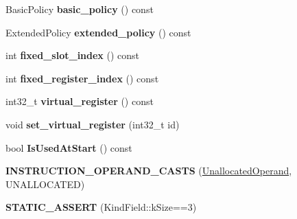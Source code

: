 \begin{DoxyCompactItemize}
\item 
Basic\+Policy {\bfseries basic\+\_\+policy} () const \hypertarget{classv8_1_1internal_1_1compiler_1_1_unallocated_operand_a96f3864297307c3fba4a3ae8106f9ed6}{}\label{classv8_1_1internal_1_1compiler_1_1_unallocated_operand_a96f3864297307c3fba4a3ae8106f9ed6}

\item 
Extended\+Policy {\bfseries extended\+\_\+policy} () const \hypertarget{classv8_1_1internal_1_1compiler_1_1_unallocated_operand_a1e8aad77edaf0aa00c8a65677c2af732}{}\label{classv8_1_1internal_1_1compiler_1_1_unallocated_operand_a1e8aad77edaf0aa00c8a65677c2af732}

\item 
int {\bfseries fixed\+\_\+slot\+\_\+index} () const \hypertarget{classv8_1_1internal_1_1compiler_1_1_unallocated_operand_a6af2c3c67decec9ea79d5a318f6a22d5}{}\label{classv8_1_1internal_1_1compiler_1_1_unallocated_operand_a6af2c3c67decec9ea79d5a318f6a22d5}

\item 
int {\bfseries fixed\+\_\+register\+\_\+index} () const \hypertarget{classv8_1_1internal_1_1compiler_1_1_unallocated_operand_afed704a1fe1e5b9241956d48691d1008}{}\label{classv8_1_1internal_1_1compiler_1_1_unallocated_operand_afed704a1fe1e5b9241956d48691d1008}

\item 
int32\+\_\+t {\bfseries virtual\+\_\+register} () const \hypertarget{classv8_1_1internal_1_1compiler_1_1_unallocated_operand_a9ff96924c7fd8e7640b352b73826c66c}{}\label{classv8_1_1internal_1_1compiler_1_1_unallocated_operand_a9ff96924c7fd8e7640b352b73826c66c}

\item 
void {\bfseries set\+\_\+virtual\+\_\+register} (int32\+\_\+t id)\hypertarget{classv8_1_1internal_1_1compiler_1_1_unallocated_operand_abee54b638709c6b74dea91dfd0f5fa4f}{}\label{classv8_1_1internal_1_1compiler_1_1_unallocated_operand_abee54b638709c6b74dea91dfd0f5fa4f}

\item 
bool {\bfseries Is\+Used\+At\+Start} () const \hypertarget{classv8_1_1internal_1_1compiler_1_1_unallocated_operand_a6f41463f77fb2ac91e8f0b1f238c149d}{}\label{classv8_1_1internal_1_1compiler_1_1_unallocated_operand_a6f41463f77fb2ac91e8f0b1f238c149d}

\item 
{\bfseries I\+N\+S\+T\+R\+U\+C\+T\+I\+O\+N\+\_\+\+O\+P\+E\+R\+A\+N\+D\+\_\+\+C\+A\+S\+TS} (\hyperlink{classv8_1_1internal_1_1compiler_1_1_unallocated_operand}{Unallocated\+Operand}, U\+N\+A\+L\+L\+O\+C\+A\+T\+ED)\hypertarget{classv8_1_1internal_1_1compiler_1_1_unallocated_operand_aa1f74bb77dcc743aa2d99418bfd5607e}{}\label{classv8_1_1internal_1_1compiler_1_1_unallocated_operand_aa1f74bb77dcc743aa2d99418bfd5607e}

\item 
{\bfseries S\+T\+A\+T\+I\+C\+\_\+\+A\+S\+S\+E\+RT} (Kind\+Field\+::k\+Size==3)\hypertarget{classv8_1_1internal_1_1compiler_1_1_unallocated_operand_ad1f69843107333599cda246905caf549}{}\label{classv8_1_1internal_1_1compiler_1_1_unallocated_operand_ad1f69843107333599cda246905caf549}

\end{DoxyCompactItemize}
